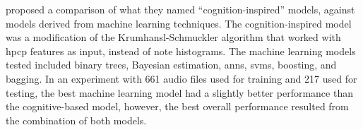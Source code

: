 \textcite{gomez2004estimating} proposed a comparison of what
they named ``cognition-inspired'' models, against models
derived from machine learning techniques. The
cognition-inspired model was a modification of the
Krumhansl-Schmuckler algorithm that worked with
\acrfull{hpcp} features as input, instead of note
histograms. The machine learning models tested included
binary trees, Bayesian estimation, \glspl{ann}, \glspl{svm},
boosting, and bagging. In an experiment with 661 audio files
used for training and 217 used for testing, the best machine
learning model had a slightly better performance than the
cognitive-based model, however, the best overall performance
resulted from the combination of both models.




